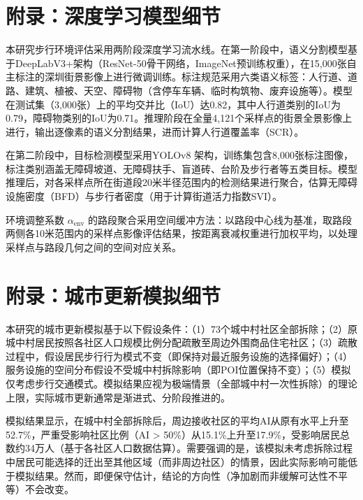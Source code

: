 \documentclass[10pt,conference]{IEEEtran}
\begin{document}
\section{附录：深度学习模型细节}

本研究步行环境评估采用两阶段深度学习流水线。在第一阶段中，语义分割模型基于DeepLabV3+架构（ResNet-50骨干网络，ImageNet预训练权重），在15,000张自主标注的深圳街景影像上进行微调训练。标注规范采用六类语义标签：人行道、道路、建筑、植被、天空、障碍物（含停车车辆、临时构筑物、废弃设施等）。模型在测试集（3,000张）上的平均交并比（IoU）达0.82，其中人行道类别的IoU为0.79，障碍物类别的IoU为0.71。推理阶段在全量4,121个采样点的街景全景影像上进行，输出逐像素的语义分割结果，进而计算人行道覆盖率（SCR）。

在第二阶段中，目标检测模型采用YOLOv8 \cite{jocher2022yolo}架构，训练集包含8,000张标注图像，标注类别涵盖无障碍坡道、无障碍扶手、盲道砖、台阶及步行者等五类目标。模型推理后，对各采样点所在街道段20米半径范围内的检测结果进行聚合，估算无障碍设施密度（BFD）与步行者密度（用于计算街道活力指数SVI）。

环境调整系数 $\alpha_{\text{env}}$ 的路段聚合采用空间缓冲方法：以路段中心线为基准，取路段两侧各10米范围内的采样点影像评估结果，按距离衰减权重进行加权平均，以处理采样点与路段几何之间的空间对应关系。

\section{附录：城市更新模拟细节}

本研究的城市更新模拟基于以下假设条件：（1）73个城中村社区全部拆除；（2）原城中村居民按照各社区人口规模比例分配疏散至周边外围商品住宅社区；（3）疏散过程中，假设居民步行行为模式不变（即保持对最近服务设施的选择偏好）；（4）服务设施的空间分布假设不受城中村拆除影响（即POI位置保持不变）；（5）模拟仅考虑步行交通模式。模拟结果应视为极端情景（全部城中村一次性拆除）的理论上限，实际城市更新通常是渐进式、分阶段推进的。

模拟结果显示，在城中村全部拆除后，周边接收社区的平均AI从原有水平上升至52.7\%，严重受影响社区比例（AI > 50\%）从15.1\%上升至17.9\%，受影响居民总数约34万人（基于各社区人口数据估算）。需要强调的是，该模拟未考虑拆除过程中居民可能选择的迁出至其他区域（而非周边社区）的情景，因此实际影响可能低于模拟结果。然而，即便保守估计，结论的方向性（净加剧而非缓解可达性不平等）不会改变。
\end{document}
